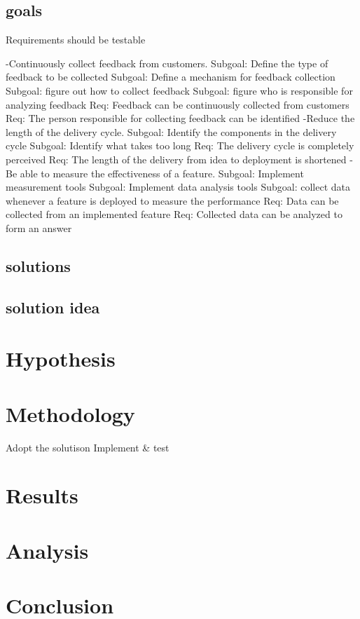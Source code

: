 \documentclass[english]{tktltiki2}
\theoremstyle{definition}
\theoremstyle{remark}
\begin{document}
\subsection{goals}
Requirements should be testable

-Continuously collect feedback from customers.
    Subgoal: Define the type of feedback to be collected
    Subgoal: Define a mechanism for feedback collection
    Subgoal: figure out how to collect feedback
    Subgoal: figure who is responsible for analyzing feedback
	Req: Feedback can be continuously collected from customers
	Req: The person responsible for collecting feedback can be identified 
-Reduce the length of the delivery cycle.
	Subgoal: Identify the components in the delivery cycle
	Subgoal: Identify what takes too long
	Req: The delivery cycle is completely perceived
	Req: The length of the delivery from idea to deployment is shortened
-Be able to measure the effectiveness of a feature.
	Subgoal: Implement measurement tools
	Subgoal: Implement data analysis tools
	Subgoal: collect data whenever a feature is deployed to measure the performance	
    Req: Data can be collected from an implemented feature 
    Req: Collected data can be analyzed to form an answer


\subsection{solutions}

\subsection{solution idea}




\section{Hypothesis}
\section{Methodology}
Adopt the solutison
Implement & test

\section{Results}
\section{Analysis}
\section{Conclusion}
\end{document}
